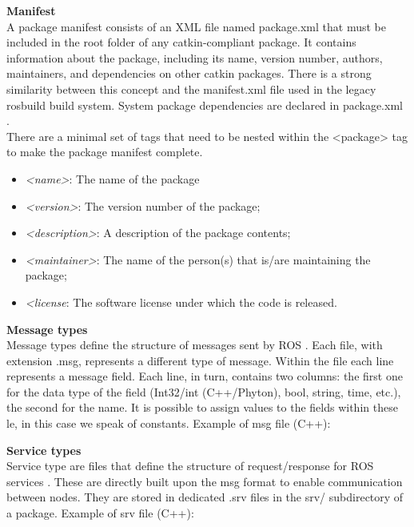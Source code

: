 \newline
\textbf{Manifest}\\
A package manifest consists of an XML file named package.xml that must be included in the root folder of any catkin-compliant package. It contains information about the package, including its name, version number, authors, maintainers, and dependencies on other catkin packages. There is a strong similarity between this concept and the manifest.xml file used in the legacy rosbuild build system. System package dependencies are declared in package.xml \citet{rosmanifest}.\\
\newpage
There are a minimal set of tags that need to be nested within the <package> tag to make the package manifest complete.
\begin{itemize}
    \item \textit{<name>}: The name of the package
    \item \textit{<version>}: The version number of the package;
    \item \textit{<description>}: A description of the package contents;
    \item \textit{<maintainer>}: The name of the person(s) that is/are maintaining the package;
    \item \textit{<license}: The software license under which the code is released.
\end{itemize}
\textbf{Message types}\\
Message types define the structure of messages sent by ROS \citet{rosmsg}. Each file, with extension .msg, represents a different type of message. Within the file each line represents a message field. Each line, in turn, contains two columns: the first one for the data type of the field
(Int32/int (C++/Phyton), bool, string, time, etc.), the second for the name. It is possible to assign values to the fields within these le, in this case we speak of constants. Example of msg file (C++):

\textbf{Service types}\\
Service type are files that define the structure of request/response for ROS services \citet{rossrv}.
These are directly built upon the msg format to enable communication between nodes. They are stored in dedicated .srv files in the srv/ subdirectory of a package.
Example of srv file (C++):

\newpage

